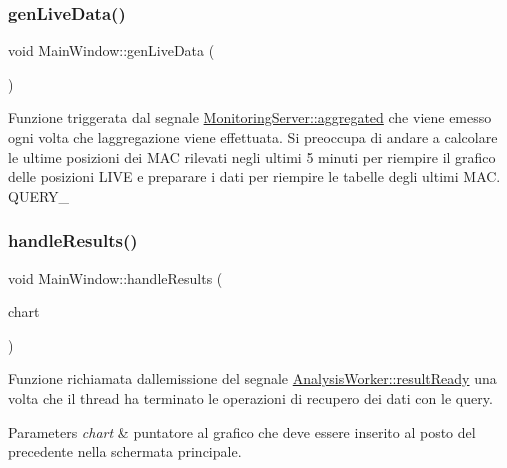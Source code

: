 \subsubsection{\texorpdfstring{gen\+Live\+Data()}{genLiveData()}}
{\footnotesize\ttfamily void Main\+Window\+::gen\+Live\+Data (\begin{DoxyParamCaption}{ }\end{DoxyParamCaption})}

Funzione triggerata dal segnale {\ttfamily \hyperlink{class_monitoring_server_af90198642c809ec801d07afa789a6869}{Monitoring\+Server\+::aggregated}} che viene emesso ogni volta che l\textquotesingle{}aggregazione viene effettuata. Si preoccupa di andare a calcolare le ultime posizioni dei M\+AC rilevati negli ultimi 5 minuti per riempire il grafico delle posizioni L\+I\+VE e preparare i dati per riempire le tabelle degli ultimi M\+AC. Q\+U\+E\+R\+Y\+\_ \mbox{\label{class_main_window_af7a262630fb46f1fac49bb816f9e1c30}} 
\subsubsection{\texorpdfstring{handle\+Results()}{handleResults()}}
{\footnotesize\ttfamily void Main\+Window\+::handle\+Results (\begin{DoxyParamCaption}\item[{\hyperlink{class_monitoring_chart}{Monitoring\+Chart} $\ast$}]{chart }\end{DoxyParamCaption})}

Funzione richiamata dall\textquotesingle{}emissione del segnale {\ttfamily \hyperlink{class_analysis_worker_aa02712f415266b80f078a65ef45defe9}{Analysis\+Worker\+::result\+Ready}} una volta che il thread ha terminato le operazioni di recupero dei dati con le query. 
\begin{DoxyParams}{Parameters}
{\em chart} & puntatore al grafico che deve essere inserito al posto del precedente nella schermata principale. \\
\hline
\end{DoxyParams}
\mbox{\label{class_main_window_aa3df0144e4ca4f616bdb0b0dab87f6bd}} 
